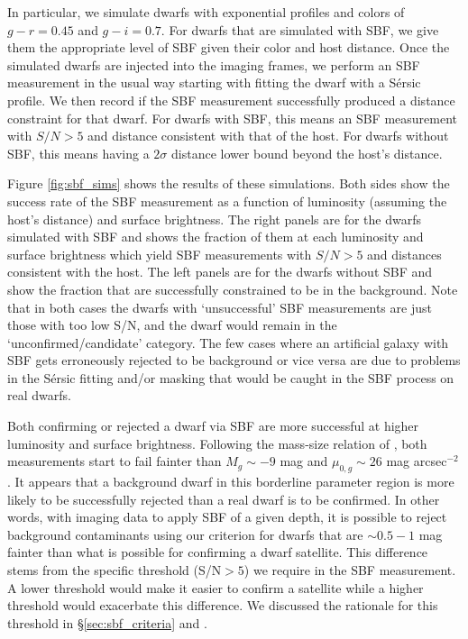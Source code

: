 \documentclass[twocolumn]{aastex62}
\begin{document}
In particular, we simulate dwarfs with exponential profiles and colors of $g-r=0.45$ and $g-i=0.7$. For dwarfs that are simulated with SBF, we give them the appropriate level of SBF given their color and host distance. Once the simulated dwarfs are injected into the imaging frames, we perform an SBF measurement in the usual way starting with fitting the dwarf with a S\'{e}rsic profile. We then record if the SBF measurement successfully produced a distance constraint for that dwarf. For dwarfs with SBF, this means an SBF measurement with $S/N>5$ and distance consistent with that of the host. For dwarfs without SBF, this means having a $2\sigma$ distance lower bound beyond the host's distance. 

Figure \ref{fig:sbf_sims} shows the results of these simulations. Both sides show the success rate of the SBF measurement as a function of luminosity (assuming the host's distance) and surface brightness. The right panels are for the dwarfs simulated with SBF and shows the fraction of them at each luminosity and surface brightness which yield SBF measurements with $S/N>5$ and distances consistent with the host. The left panels are for the dwarfs without SBF and show the fraction that are successfully constrained to be in the background. Note that in both cases the dwarfs with `unsuccessful' SBF measurements are just those with too low S/N, and the dwarf would remain in the `unconfirmed/candidate' category. The few cases where an artificial galaxy with SBF gets erroneously rejected to be background or vice versa are due to problems in the S\'{e}rsic fitting and/or masking that would be caught in the SBF process on real dwarfs. 

Both confirming or rejected a dwarf via SBF are more successful at higher luminosity and surface brightness. Following the mass-size relation of \citet{carlsten2021a}, both measurements start to fail fainter than $M_g\sim-9$ mag and $\mu_{0,g}\sim 26$ mag arcsec$^{-2}$. It appears that a background dwarf in this borderline parameter region is more likely to be successfully rejected than a real dwarf is to be confirmed. In other words, with imaging data to apply SBF of a given depth, it is possible to reject background contaminants using our criterion for dwarfs that are $\sim0.5-1$ mag fainter than what is possible for confirming a dwarf satellite. This difference stems from the specific threshold (S/N$>5$) we require in the SBF measurement. A lower threshold would make it easier to confirm a satellite while a higher threshold would exacerbate this difference. We discussed the rationale for this threshold in \S\ref{sec:sbf_criteria} and \citet{carlsten2020b}. 
\end{document}
